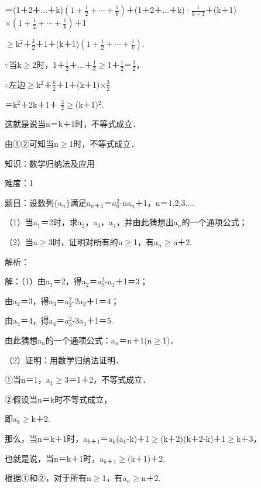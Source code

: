 \documentclass{article} %
\begin{document}
＝(1＋2＋{$\dots$}＋k)$(1+\frac{1}{2}+\cdots+\frac{1}{k})$＋(1＋2＋{$\dots$}＋k)·$\frac{1}{k+1}$＋(k＋1)$\mathrm{\times}(1+\frac{1}{2}+\cdots+\frac{1}{k})$＋1

$\mathrm{\ge}$k${}^{2}$＋$\frac{k}{2}$＋1＋(k＋1)$(1+\frac{1}{2}+\cdots+\frac{1}{k})$.

$\mathrm{\because}$当k$\mathrm{\ge}$2时，1＋$\frac{1}{2}$＋{$\dots$}＋$\frac{1}{k}\mathrm{\ge}$1＋$\frac{1}{2}$＝$\frac{3}{2}$，

$\mathrm{\therefore}$左边$\mathrm{\ge}$k${}^{2}$＋$\frac{k}{2}$＋1＋(k＋1)$\mathrm{\times}\frac{3}{2}$

＝k${}^{2}$＋2k＋1＋   $\frac{3}{2}\mathrm{\ge}$(k＋1)${}^{2}$.

这就是说当n＝k＋1时，不等式成立．

由①②可知当n$\mathrm{\ge}$1时，不等式成立．

 

 知识：数学归纳法及应用

 难度：1

 题目：设数列$\mathrm{\{}$a${}_{n}$$\mathrm{\}}$满足a${}_{n}$${}_{\textrm{＋}}$${}_{1}$＝$a_0^2$-na${}_{n}$＋1，n＝1,2,3{$\dots$}.

（1）当a${}_{1}$＝2时，求a${}_{2}$，a${}_{3}$，a${}_{4}$，并由此猜想出a${}_{n}$的一个通项公式；

（2）当a$\mathrm{\ge}$3时，证明对所有的n$\mathrm{\ge}$1，有a${}_{n}$$\mathrm{\ge}$n＋2.

 解析：

 解：（1）由a${}_{1}$＝2，得a${}_{2}$＝$a_0^2$-a${}_{1}$＋1＝3；

由a${}_{2}$＝3，得a${}_{3}$＝a$_2^2$-2a${}_{2}$＋1＝4；

由a${}_{3}$＝4，得a${}_{4}$＝$a_3^2$-3a${}_{3}$＋1＝5.

由此猜想a${}_{n}$的一个通项公式：a${}_{n}$＝n＋1(n$\mathrm{\ge}$1)．

（2）证明：用数学归纳法证明．

①当n＝1，a${}_{1}$$\mathrm{\ge}$3＝1＋2，不等式成立．

②假设当n＝k时不等式成立，

即a${}_{k}$$\mathrm{\ge}$k＋2.

那么，当n＝k＋1时，a${}_{k}$${}_{\textrm{＋}}$${}_{1}$＝a${}_{k}$(a${}_{k}$-k)＋1$\mathrm{\ge}$(k＋2)(k＋2-k)＋1$\mathrm{\ge}$k＋3，

也就是说，当n＝k＋1时，a${}_{k}$${}_{\textrm{＋}}$${}_{1}$$\mathrm{\ge}$(k＋1)＋2.

根据①和②，对于所有n$\mathrm{\ge}$1，有a${}_{n}$$\mathrm{\ge}$n＋2.
\end{document}
